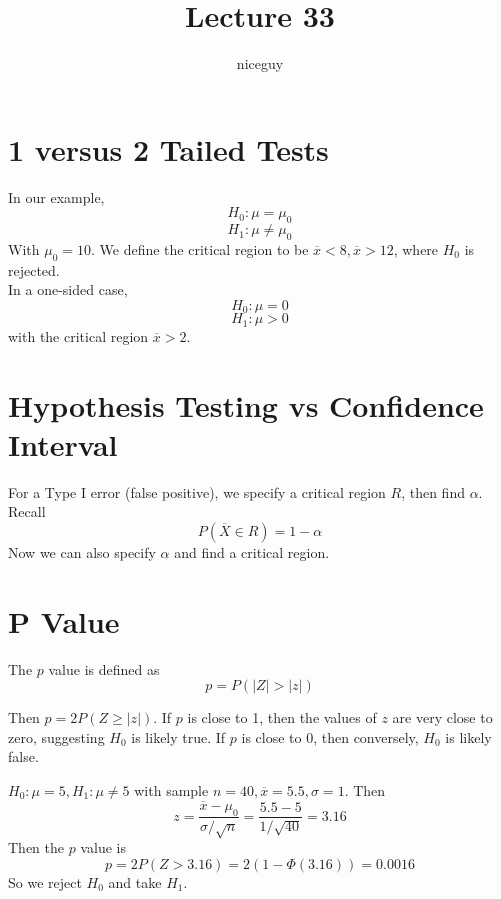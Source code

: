 \documentclass[12pt]{article}
\author{niceguy}
\title{Lecture 33}
\begin{document}
\maketitle

\section{1 versus 2 Tailed Tests}

In our example,
$$H_0: \mu = \mu_0$$
$$H_1: \mu \neq \mu_0$$
With $\mu_0 = 10$. We define the critical region to be $\overline x < 8, \overline x > 12$, where $H_0$ is rejected. \\
In a one-sided case,
$$H_0: \mu = 0$$
$$H_1: \mu > 0$$
with the critical region $\overline x > 2$.

\section{Hypothesis Testing vs Confidence Interval}

For a Type I error (false positive), we specify a critical region $R$, then find $\alpha$. Recall
$$P(\overline X \in R) = 1 - \alpha$$
Now we can also specify $\alpha$ and find a critical region.

\section{P Value}

\begin{defn}
    The $p$ value is defined as
    $$p = P(|Z| > |z|)$$
\end{defn}

Then $p = 2P(Z \geq |z|)$. If $p$ is close to 1, then the values of $z$ are very close to zero, suggesting $H_0$ is likely true. If $p$ is close to 0, then conversely, $H_0$ is likely false.

\begin{ex}
    $H_0: \mu = 5, H_1: \mu \neq 5$ with sample $n=40, \overline x = 5.5, \sigma = 1$. Then
    $$z = \frac{\overline x - \mu_0}{\sigma/\sqrt{n}} = \frac{5.5-5}{1/\sqrt{40}} = 3.16$$
    Then the $p$ value is
    $$p = 2P(Z > 3.16) = 2(1 - \Phi(3.16)) = 0.0016$$
    So we reject $H_0$ and take $H_1$.
\end{ex}
\end{document}
